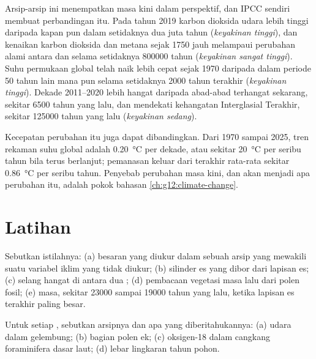 Arsip-arsip ini menempatkan masa kini dalam perspektif, dan IPCC sendiri
membuat perbandingan itu. Pada tahun 2019 karbon dioksida udara lebih tinggi
daripada kapan pun dalam setidaknya dua juta tahun (\emph{keyakinan tinggi}),
dan kenaikan karbon dioksida dan metana sejak 1750 jauh melampaui perubahan
alami antara  dan  selama setidaknya \num{800000}
tahun (\emph{keyakinan sangat tinggi}). Suhu permukaan global telah naik lebih
cepat sejak 1970 daripada dalam periode 50 tahun lain mana pun selama
setidaknya \num{2000} tahun terakhir (\emph{keyakinan tinggi}). Dekade
2011--2020 lebih hangat daripada abad-abad terhangat  sekarang,
sekitar \num{6500} tahun yang lalu, dan mendekati kehangatan Interglasial
Terakhir, sekitar \num{125000} tahun yang lalu (\emph{keyakinan sedang}).

Kecepatan perubahan itu juga dapat dibandingkan. Dari 1970 sampai 2025, tren
rekaman suhu global adalah \qty{0.20}{\degreeCelsius} per dekade, atau sekitar
\qty{20}{\degreeCelsius} per seribu tahun bila terus berlanjut; pemanasan
keluar dari  terakhir rata-rata sekitar
\qty{0.86}{\degreeCelsius} per seribu tahun. Penyebab perubahan masa kini, dan
akan menjadi apa perubahan itu, adalah pokok bahasan
\cref{ch:g12:climate-change}.

\section{Latihan}

\begin{exercise}[$\star$]\label{exo:g12:past-climates:1}
Sebutkan istilahnya: (a) besaran yang diukur dalam sebuah arsip yang mewakili
suatu variabel iklim yang tidak diukur; (b) silinder es yang dibor dari lapisan
es; (c) selang hangat di antara dua ; (d) pembacaan vegetasi
masa lalu dari polen fosil; (e) masa, sekitar \num{23000} sampai \num{19000}
tahun yang lalu, ketika lapisan es terakhir paling besar.
\end{exercise}

\begin{exercise}[$\star$]\label{exo:g12:past-climates:2}
Untuk setiap , sebutkan arsipnya dan apa yang diberitahukannya: (a) udara
dalam gelembung; (b) bagian polen ek; (c) oksigen-18 dalam cangkang
foraminifera dasar laut; (d) lebar lingkaran tahun pohon.
\end{exercise}

